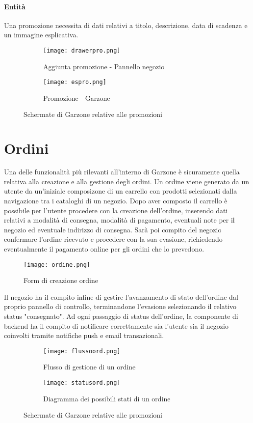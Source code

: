 \paragraph{Entità} Una promozione necessita di dati relativi a titolo, descrizione, data di scadenza e un immagine esplicativa.
\begin{figure}[h!]
    \begin{subfigure}{0.5\textwidth}
    \texttt{[image: drawerpro.png]} 
    \caption{Aggiunta promozione - Pannello negozio}
    \label{fig:subim1}
    \end{subfigure}
    \begin{subfigure}{0.5\textwidth}
    \texttt{[image: espro.png]}
    \caption{Promozione - Garzone}
    \label{fig:subim2}
    \end{subfigure}
    
    \caption{Schermate di Garzone relative alle promozioni}
    \label{fig:image2}
\end{figure}
\section{Ordini}
Una delle funzionalità più rilevanti all'interno di Garzone è sicuramente quella relativa alla creazione e alla gestione degli ordini. Un ordine viene generato da un utente da un'iniziale composizone di un carrello con prodotti selezionati dalla navigazione tra i cataloghi di un negozio. Dopo aver composto il carrello è possibile per l'utente procedere con la creazione dell'ordine, inserendo dati relativi a modalità di consegna, modalità di pagamento, eventuali note per il negozio ed eventuale indirizzo di consegna. Sarà poi compito del negozio confermare l'ordine ricevuto e procedere con la sua evasione, richiedendo eventualmente il pagamento online per gli ordini che lo prevedono. 
\begin{figure}[h!]
    \centering
    \texttt{[image: ordine.png]}
    \caption{Form di creazione ordine}
\end{figure}
Il negozio ha il compito infine di gestire l'avanzamento di stato dell'ordine dal proprio pannello di controllo, terminandone l'evasione selezionando il relativo status "consegnato". Ad ogni passaggio di status dell'ordine, la componente di backend ha il compito di notificare correttamente sia l'utente sia il negozio coinvolti tramite notifiche push e email transazionali. 
\begin{figure}[h!]
    \begin{subfigure}{0.5\textwidth}
    \texttt{[image: flussoord.png]}
    \caption{Flusso di gestione di un ordine}
    \label{fig:subim1}
    \end{subfigure}
    \begin{subfigure}{0.5\textwidth}
    \texttt{[image: statusord.png]}
    \caption{Diagramma dei possibili stati di un ordine}
    \label{fig:subim2}
    \end{subfigure}
    
    \caption{Schermate di Garzone relative alle promozioni}
    \label{fig:image2}
\end{figure}
\FloatBarrier
